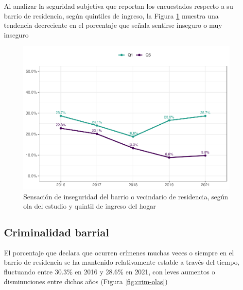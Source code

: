 \documentclass[
  12pt,
]{book}
\begin{document}
Al analizar la seguridad subjetiva que reportan los encuestados respecto a su barrio de residencia, según quintiles de ingreso, la Figura \ref{fig:seguri-quintil} muestra una tendencia decreciente en el porcentaje que señala sentirse inseguro o muy inseguro

\begin{figure}

{\centering \includegraphics{reporte-elsoc_files/figure-latex/seguri-quintil-1} 

}

\caption{Sensación de inseguridad del barrio o vecindario de residencia, según ola del estudio y quintil de ingreso del hogar}\label{fig:seguri-quintil}
\end{figure}

\hypertarget{criminalidad-barrial}{%
\subsection*{Criminalidad barrial}\label{criminalidad-barrial}}

El porcentaje que declara que ocurren crímenes muchas veces o siempre en el barrio de residencia se ha mantenido relativamente estable a través del tiempo, fluctuando entre 30.3\% en 2016 y 28.6\% en 2021, con leves aumentos o disminuciones entre dichos años (Figura \ref{fig:crim-olas})
\end{document}
